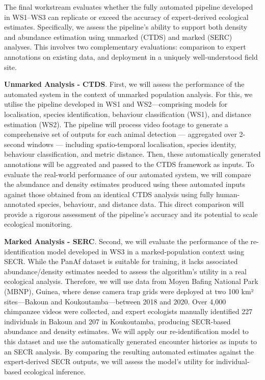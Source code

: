 \documentclass{article}
\begin{document}
The final workstream evaluates whether the fully automated pipeline developed in WS1–WS3 can replicate or exceed the accuracy of expert-derived ecological estimates. Specifically, we assess the pipeline’s ability to support both density and abundance estimation using unmarked (CTDS) and marked (SERC) analyses. This involves two complementary evaluations: comparison to expert annotations on existing data, and deployment in a uniquely well-understood field site.


\textbf{Unmarked Analysis - CTDS}. First, we will assess the performance of the automated system in the context of unmarked population analysis. For this, we utilise the pipeline developed in WS1 and WS2—comprising models for localisation, species identification, behaviour classification (WS1), and distance estimation (WS2). The pipeline will process video footage to generate a comprehensive set of outputs for each animal detection — aggregated over 2-second windows — including spatio-temporal localisation, species identity, behaviour classification, and metric distance. Then, these automatically generated annotations will be aggreated and passed to the CTDS framework as inputs. To evaluate the real-world performance of our automated system, we will compare the abundance and density estimates produced using these automated inputs against those obtained from an identical CTDS analysis using fully human-annotated species, behaviour, and distance data. This direct comparison will provide a rigorous assessment of the pipeline’s accuracy and its potential to scale ecological monitoring.


\textbf{Marked Analysis - SERC}. Second, we will evaluate the performance of the re-identification model developed in WS3 in a marked-population context using SECR. While the PanAf dataset is suitable for training, it lacks associated abundance/density estimates needed to assess the algorithm’s utility in a real ecological analysis. Therefore, we will use data from Moyen Bafing National Park (MBNP), Guinea, where dense camera trap grids were deployed at two 100 km² sites—Bakoun and Koukoutamba—between 2018 and 2020. Over 4,000 chimpanzee videos were collected, and expert ecologists manually identified 227 individuals in Bakoun and 207 in Koukoutamba, producing SECR-based abundance and density estimates. We will apply our re-identification model to this dataset and use the automatically generated encounter histories as inputs to an SECR analysis. By comparing the resulting automated estimates against the expert-derived SECR outputs, we will assess the model’s utility for individual-based ecological inference.
\end{document}
